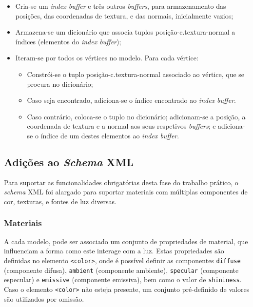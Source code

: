 \documentclass[12pt, a4paper]{article}
\begin{document}
\begin{itemize}
    \item Cria-se um \emph{index buffer} e três outros \emph{buffers}, para armazenamento das
        posições, das coordenadas de textura, e das normais, inicialmente vazios;

    \item Armazena-se um dicionário que associa tuplos posição-c.textura-normal a índices (elementos
        do \emph{index buffer});

    \item Iteram-se por todos os vértices no modelo. Para cada vértice:
        \begin{itemize}
            \item Constrói-se o tuplo posição-c.textura-normal associado ao vértice, que se procura
                no dicionário;
            \item Caso seja encontrado, adiciona-se o índice encontrado ao \emph{index buffer}.
            \item Caso contrário, coloca-se o tuplo no dicionário; adicionam-se a posição, a
                coordenada de textura e a normal aos seus respetivos \emph{buffers}; e adiciona-se o
                índice de um destes elementos ao \emph{index buffer}.
        \end{itemize}
\end{itemize}

\subsection{Adições ao \emph{Schema} XML}

Para suportar as funcionalidades obrigatórias desta fase do trabalho prático, o \emph{schema} XML
foi alargado para suportar materiais com múltiplas componentes de cor, texturas, e fontes de luz
diversas.

\subsubsection{Materiais}

A cada modelo, pode ser associado um conjunto de propriedades de material, que influenciam a forma
como este interage com a luz. Estas propriedades são definidas no elemento \texttt{<color>}, onde é
possível definir as componentes \texttt{diffuse} (componente difusa), \texttt{ambient} (componente
ambiente), \texttt{specular} (componente especular) e \texttt{emissive} (componente emissiva), bem
como o valor de \texttt{shininess}. Caso o elemento \texttt{<color>} não esteja presente, um
conjunto pré-definido de valores são utilizados por omissão.
\end{document}
